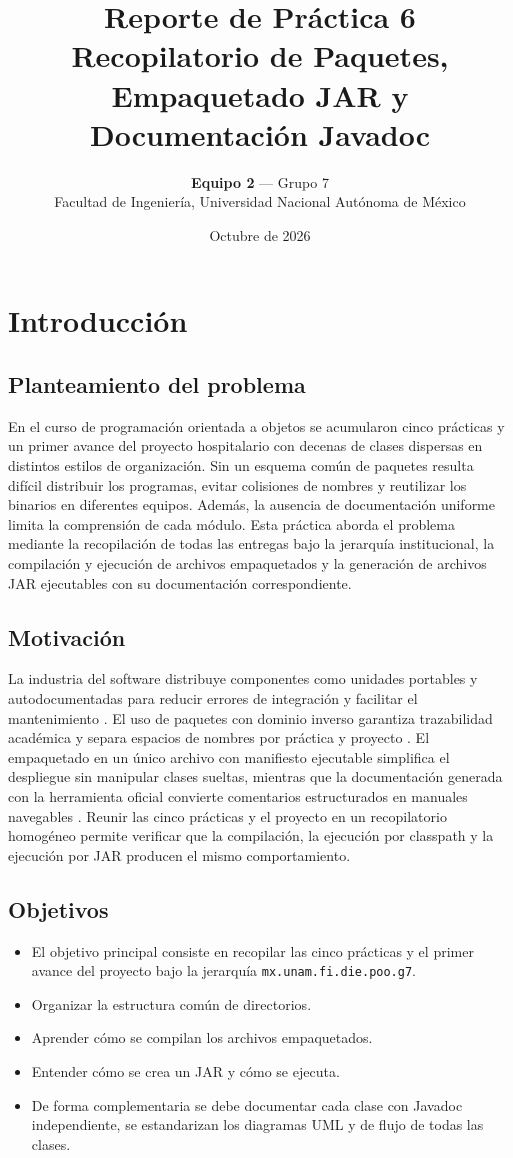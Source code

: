 \documentclass[letterpaper,12pt,oneside]{article}
\title{\textbf{Reporte de Pr\'actica 6}\\\large Recopilatorio de Paquetes, Empaquetado JAR y Documentaci\'on Javadoc}
\author{\textbf{Equipo 2} — Grupo 7\\Facultad de Ingenier\'ia, Universidad Nacional Aut\'onoma de M\'exico}
\date{Octubre de 2026}
\numberwithin{figure}{section}
\begin{document}

\tableofcontents
\clearpage

\section{Introducci\'on}

\subsection{Planteamiento del problema}
En el curso de programaci\'on orientada a objetos se acumularon cinco pr\'acticas y un primer avance del proyecto hospitalario con decenas de clases dispersas en distintos estilos de organizaci\'on. Sin un esquema com\'un de paquetes resulta dif\'icil distribuir los programas, evitar colisiones de nombres y reutilizar los binarios en diferentes equipos. Adem\'as, la ausencia de documentaci\'on uniforme limita la comprensi\'on de cada m\'odulo. Esta pr\'actica aborda el problema mediante la recopilaci\'on de todas las entregas bajo la jerarqu\'ia institucional, la compilaci\'on y ejecuci\'on de archivos empaquetados y la generaci\'on de archivos JAR ejecutables con su documentaci\'on correspondiente.

\subsection{Motivaci\'on}
La industria del software distribuye componentes como unidades portables y autodocumentadas para reducir errores de integraci\'on y facilitar el mantenimiento \cite{deitel}. El uso de paquetes con dominio inverso garantiza trazabilidad acad\'emica y separa espacios de nombres por pr\'actica y proyecto \cite{oracle}. El empaquetado en un \'unico archivo con manifiesto ejecutable simplifica el despliegue sin manipular clases sueltas, mientras que la documentaci\'on generada con la herramienta oficial convierte comentarios estructurados en manuales navegables \cite{joyanes}. Reunir las cinco pr\'acticas y el proyecto en un recopilatorio homog\'eneo permite verificar que la compilaci\'on, la ejecuci\'on por classpath y la ejecuci\'on por JAR producen el mismo comportamiento.

\subsection{Objetivos}
\begin{itemize}
\item El objetivo principal consiste en recopilar las cinco pr\'acticas y el primer avance del proyecto bajo la jerarqu\'ia \texttt{mx.unam.fi.die.poo.g7}.
\item Organizar la estructura com\'un de directorios.
\item Aprender c\'omo se compilan los archivos empaquetados.
\item Entender c\'omo se crea un JAR y c\'omo se ejecuta.
\item De forma complementaria se debe documentar cada clase con Javadoc independiente, se estandarizan los diagramas UML y de flujo de todas las clases.
\end{itemize}
\end{document}
